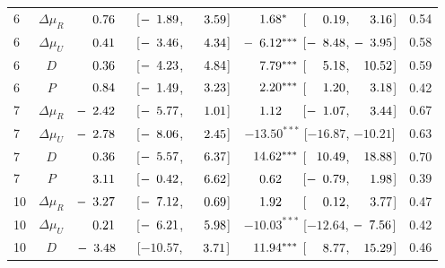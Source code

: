 \begin{longtable}{lcccc}
6 & $\Delta\mu_{R}$ & $\hphantom{-}\hphantom{0}0.76^{\hphantom{***}}$ [$-\hphantom{0}1.89$, $\hphantom{-}\hphantom{0}3.59$] & $\hphantom{-}\hphantom{0}1.68^{*\hphantom{**}}$ [$\hphantom{-}\hphantom{0}0.19$, $\hphantom{-}\hphantom{0}3.16$] & 0.54 \\
6 & $\Delta\mu_{U}$ & $\hphantom{-}\hphantom{0}0.41^{\hphantom{***}}$ [$-\hphantom{0}3.46$, $\hphantom{-}\hphantom{0}4.34$] & $-\hphantom{0}6.12^{***}$ [$-\hphantom{0}8.48$, $-\hphantom{0}3.95$] & 0.58 \\
6 & $D$ & $\hphantom{-}\hphantom{0}0.36^{\hphantom{***}}$ [$-\hphantom{0}4.23$, $\hphantom{-}\hphantom{0}4.84$] & $\hphantom{-}\hphantom{0}7.79^{***}$ [$\hphantom{-}\hphantom{0}5.18$, $\hphantom{-}10.52$] & 0.59 \\
6 & $P$ & $\hphantom{-}\hphantom{0}0.84^{\hphantom{***}}$ [$-\hphantom{0}1.49$, $\hphantom{-}\hphantom{0}3.23$] & $\hphantom{-}\hphantom{0}2.20^{***}$ [$\hphantom{-}\hphantom{0}1.20$, $\hphantom{-}\hphantom{0}3.18$] & 0.42 \\
7 & $\Delta\mu_{R}$ & $-\hphantom{0}2.42^{\hphantom{***}}$ [$-\hphantom{0}5.77$, $\hphantom{-}\hphantom{0}1.01$] & $\hphantom{-}\hphantom{0}1.12^{\hphantom{***}}$ [$-\hphantom{0}1.07$, $\hphantom{-}\hphantom{0}3.44$] & 0.67 \\
7 & $\Delta\mu_{U}$ & $-\hphantom{0}2.78^{\hphantom{***}}$ [$-\hphantom{0}8.06$, $\hphantom{-}\hphantom{0}2.45$] & $-13.50^{***}$ [$-16.87$, $-10.21$] & 0.63 \\
7 & $D$ & $\hphantom{-}\hphantom{0}0.36^{\hphantom{***}}$ [$-\hphantom{0}5.57$, $\hphantom{-}\hphantom{0}6.37$] & $\hphantom{-}14.62^{***}$ [$\hphantom{-}10.49$, $\hphantom{-}18.88$] & 0.70 \\
7 & $P$ & $\hphantom{-}\hphantom{0}3.11^{\hphantom{***}}$ [$-\hphantom{0}0.42$, $\hphantom{-}\hphantom{0}6.62$] & $\hphantom{-}\hphantom{0}0.62^{\hphantom{***}}$ [$-\hphantom{0}0.79$, $\hphantom{-}\hphantom{0}1.98$] & 0.39 \\
10 & $\Delta\mu_{R}$ & $-\hphantom{0}3.27^{\hphantom{***}}$ [$-\hphantom{0}7.12$, $\hphantom{-}\hphantom{0}0.69$] & $\hphantom{-}\hphantom{0}1.92^{\hphantom{***}}$ [$\hphantom{-}\hphantom{0}0.12$, $\hphantom{-}\hphantom{0}3.77$] & 0.47 \\
10 & $\Delta\mu_{U}$ & $\hphantom{-}\hphantom{0}0.21^{\hphantom{***}}$ [$-\hphantom{0}6.21$, $\hphantom{-}\hphantom{0}5.98$] & $-10.03^{***}$ [$-12.64$, $-\hphantom{0}7.56$] & 0.42 \\
10 & $D$ & $-\hphantom{0}3.48^{\hphantom{***}}$ [$-10.57$, $\hphantom{-}\hphantom{0}3.71$] & $\hphantom{-}11.94^{***}$ [$\hphantom{-}\hphantom{0}8.77$, $\hphantom{-}15.29$] & 0.46 \\

\end{longtable}

